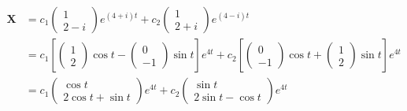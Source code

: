 \documentclass{article}
\begin{document}
\begin{align*}
  \mathbf{X} & = c_1 \begin{pmatrix}
                       1 \\
                       2 - i
                     \end{pmatrix} e^{(4 + i) t} + c_2 \begin{pmatrix}
                                                         1 \\
                                                         2 + i
                                                       \end{pmatrix} e^{(4 - i) t}                                                                               \\
             & = c_1 \left[ \begin{pmatrix}
                                1 \\
                                2
                              \end{pmatrix} \cos t - \begin{pmatrix}
                                                       0 \\
                                                       -1
                                                     \end{pmatrix} \sin t \right] e^{4 t} + c_2 \left[ \begin{pmatrix}
                                                                                                         0 \\
                                                                                                         -1
                                                                                                       \end{pmatrix} \cos t + \begin{pmatrix}
                                                                                                                                1 \\
                                                                                                                                2
                                                                                                                              \end{pmatrix} \sin t \right] e^{4 t} \\
             & = c_1 \begin{pmatrix}
                       \cos t \\
                       2 \cos t + \sin t
                     \end{pmatrix} e^{4 t} + c_2 \begin{pmatrix}
                                                   \sin t \\
                                                   2 \sin t - \cos t
                                                 \end{pmatrix} e^{4 t}
\end{align*}
\end{document}
